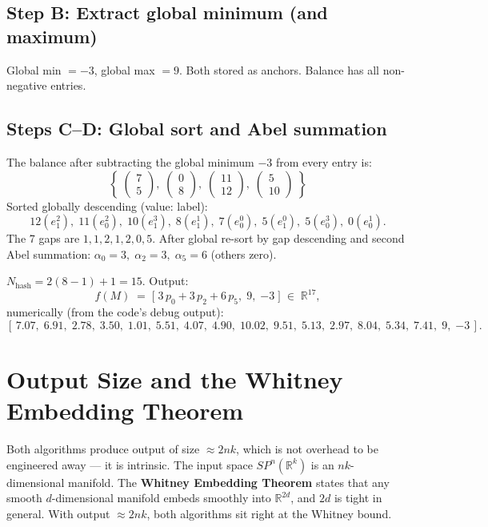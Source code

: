 \documentclass[11pt,a4paper]{article}
\newcommand{\eji}[2]{e^{#1}_{#2}}       %
\newcommand{\R}{\mathbb{R}}
\newcommand{\SP}[2]{SP^{#1}(\R^{#2})}  %
\begin{document}
\subsection*{Step B: Extract global minimum (and maximum)}

Global min $= -3$, global max $= 9$.  Both stored as anchors.  Balance has
all non-negative entries.

\subsection*{Steps C--D: Global sort and Abel summation}

The balance after subtracting the global minimum $-3$ from every entry is:
\[
  \left\{\;\begin{pmatrix}7\\5\end{pmatrix},\;
            \begin{pmatrix}0\\8\end{pmatrix},\;
            \begin{pmatrix}11\\12\end{pmatrix},\;
            \begin{pmatrix}5\\10\end{pmatrix}\;\right\}
\]
Sorted globally descending (value: label):
\[
  12(\eji{2}{1}),\;11(\eji{2}{0}),\;10(\eji{3}{1}),\;8(\eji{1}{1}),\;
  7(\eji{0}{0}),\;5(\eji{0}{1}),\;5(\eji{3}{0}),\;0(\eji{1}{0}).
\]
The 7 gaps are $1,1,2,1,2,0,5$.  After global re-sort by gap descending and
second Abel summation: $\alpha_0=3,\;\alpha_2=3,\;\alpha_5=6$ (others zero).

$N_{\text{hash}} = 2(8{-}1){+}1 = 15$. Output:
\[
  f(M) \;=\;
  \bigl[\;3\,p_0 + 3\,p_2 + 6\,p_5,\;9,\;{-3}\;\bigr]
  \;\in\; \R^{17},
\]
numerically (from the code's debug output):
\[
  [\,7.07,\;6.91,\;2.78,\;3.50,\;1.01,\;5.51,\;4.07,\;4.90,\;10.02,\;
   9.51,\;5.13,\;2.97,\;8.04,\;5.34,\;7.41,\;9,\;{-3}\,].
\]

\section{Output Size and the Whitney Embedding Theorem}
\label{sec:whitney}

Both algorithms produce output of size $\approx 2nk$, which is not overhead to
be engineered away — it is intrinsic.  The input space $\SP{n}{k}$ is an
$nk$-dimensional manifold.  The \textbf{Whitney Embedding Theorem} states that
any smooth $d$-dimensional manifold embeds smoothly into $\R^{2d}$, and $2d$
is tight in general.  With output $\approx 2nk$, both algorithms sit right at
the Whitney bound.
\end{document}
